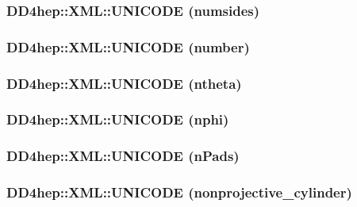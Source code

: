 \hypertarget{namespace_d_d4hep_1_1_x_m_l_a20f83649d0983872196ab2475768bbd4}{
\subsubsection[{UNICODE}]{\setlength{\rightskip}{0pt plus 5cm}DD4hep::XML::UNICODE (numsides)}}
\label{namespace_d_d4hep_1_1_x_m_l_a20f83649d0983872196ab2475768bbd4}
\hypertarget{namespace_d_d4hep_1_1_x_m_l_ad0b76e024c44947a4c3d0e9fcc9aa9c5}{
\subsubsection[{UNICODE}]{\setlength{\rightskip}{0pt plus 5cm}DD4hep::XML::UNICODE (number)}}
\label{namespace_d_d4hep_1_1_x_m_l_ad0b76e024c44947a4c3d0e9fcc9aa9c5}
\hypertarget{namespace_d_d4hep_1_1_x_m_l_ab79f1b31012180a9fc1c35731915b35a}{
\subsubsection[{UNICODE}]{\setlength{\rightskip}{0pt plus 5cm}DD4hep::XML::UNICODE (ntheta)}}
\label{namespace_d_d4hep_1_1_x_m_l_ab79f1b31012180a9fc1c35731915b35a}
\hypertarget{namespace_d_d4hep_1_1_x_m_l_ab95167cdaa5e343a440636b77d02768d}{
\subsubsection[{UNICODE}]{\setlength{\rightskip}{0pt plus 5cm}DD4hep::XML::UNICODE (nphi)}}
\label{namespace_d_d4hep_1_1_x_m_l_ab95167cdaa5e343a440636b77d02768d}
\hypertarget{namespace_d_d4hep_1_1_x_m_l_a1dc4956b679a83bac03a0ce23e65652d}{
\subsubsection[{UNICODE}]{\setlength{\rightskip}{0pt plus 5cm}DD4hep::XML::UNICODE (nPads)}}
\label{namespace_d_d4hep_1_1_x_m_l_a1dc4956b679a83bac03a0ce23e65652d}
\hypertarget{namespace_d_d4hep_1_1_x_m_l_aafb4b59f013f6ec65c2d6245c1a27eb6}{
\subsubsection[{UNICODE}]{\setlength{\rightskip}{0pt plus 5cm}DD4hep::XML::UNICODE (nonprojective\_\-cylinder)}}
